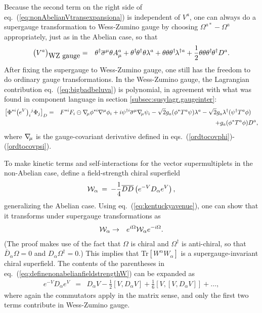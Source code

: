 \documentclass[12pt]{article}
\def\BDplus{+}
\def\thetasigmamuthetadagger{\theta\sigma^\mu\theta^\dagger}
\def\BDplus{-}
\def\thetasigmamuthetadagger{\theta^\dagger\sigmabar^\mu\theta}
\def\BDplus{\oplus}
\def\thetasigmamuthetadagger{\theta\sigma^\mu\theta^\dagger}
\def\BDplus{\ominus}
\def\thetasigmamuthetadagger{\theta^\dagger\sigmabar^\mu\theta}
\newcommand{\thdthd}{\theta^\dagger\hspace{-1pt}\theta^\dagger}
\newcommand{\nablasubmu}{\nabla\hspace{-2pt}{}_\mu}
\def\beq{\begin{eqnarray}}
\def\eeq{\end{eqnarray}}
\def\sigmabar{\overline\sigma}
\def\Dcon{\overline D}
\begin{document}
Because the second term on the right side of eq.~(\ref{eq:nonAbelianVtransexpansiona}) is  
independent of $V^a$, one can always do a supergauge transformation to Wess-Zumino gauge
by choosing $\Omega^{a*} - \Omega^a$ appropriately, 
just as in the
Abelian case, so that
\beq
\bigl (V^a \bigr )_{\mbox{WZ gauge}}
&=& 
\thetasigmamuthetadagger  A^a_\mu
+ \thdthd \theta \lambda^a 
+ \theta \theta  \theta^\dagger\hspace{-1pt} \lambda^{\dagger a} 
+ \frac{1}{2} \theta\theta\thdthd D^a .
\eeq
After fixing the supergauge to Wess-Zumino gauge, one still has the freedom to do ordinary
gauge transformations.
In the Wess-Zumino gauge, the Lagrangian contribution eq.~(\ref{eq:bigbadbeluva}) is polynomial,
in agreement with what was found in component language in section 
\ref{subsec:susylagr.gaugeinter}:
\beq
\left [ \Phi^{*i} \bigl (e^{V} \bigr )_i{}^j \Phi_j \right ]_D 
&=&
F^{*i} F_i 
\BDplus \nablasubmu \phi^{*i} \nabla^\mu \phi_i
+ i \psi^{\dagger i} \sigmabar^\mu \nablasubmu \psi_i
- \sqrt{2} g_a (\phi^{*} T^a \psi) \lambda^a 
- \sqrt{2} g_a \lambda^\dagger (\psi^{\dagger } T^a \phi)
\phantom{xx}
\nonumber \\ &&
+ g_a  (\phi^{*} T^a \phi) D^a,
\eeq 
where $\nablasubmu$ is the gauge-covariant derivative
defined in eqs.~(\ref{ordtocovphi})-(\ref{ordtocovpsi}).


To make kinetic terms and self-interactions for the vector 
supermultiplets in the non-Abelian case,
define a field-strength chiral superfield
\beq
{\cal W}_\alpha \>=\> -\frac{1}{4} \Dcon\Dcon 
\left (e^{-V} D_\alpha e^V \right),
\label{eq:definenonabelianfieldstrengthW}
\eeq
generalizing the Abelian case.
Using eq.~(\ref{eq:kentuckyavenue}), 
one can show that it transforms under supergauge transformations as
\beq
{\cal W}_\alpha &\rightarrow& e^{i\Omega} {\cal W}_\alpha e^{-i\Omega}
.
\eeq
(The proof makes use of the fact that $\Omega$ is chiral and $\Omega^\dagger$ is anti-chiral, so that $\Dcon_{\dot\alpha} \Omega = 0$
and $D_\alpha \Omega^\dagger = 0$.) This implies that Tr$[W^\alpha W_\alpha]$
is a supergauge-invariant chiral superfield.
The contents of the parentheses in 
eq.~(\ref{eq:definenonabelianfieldstrengthW}) can be expanded as 
\beq
e^{-V} D_\alpha e^V &=& D_\alpha V - \frac{1}{2} [V, D_\alpha V]
+ \frac{1}{6} \left [V, \left [V, D_\alpha V\right ] \right ] + \ldots ,
\eeq
where again the commutators apply in the matrix sense, and only the first two terms 
contribute in Wess-Zumino gauge.
\end{document}
